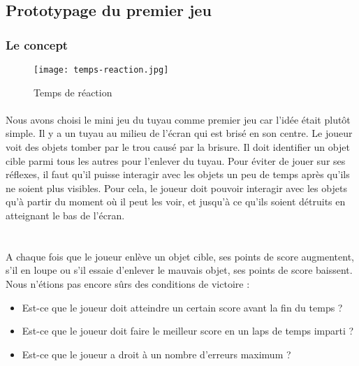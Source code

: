 \subsection{Prototypage du premier jeu}


\subsubsection{Le concept}


\begin{wrapfigure}[15]{l}{5cm}
    \vspace{-15pt}
    \texttt{[image: temps-reaction.jpg]}
    \captionsetup{labelformat=simpleNumber}
    \caption{Temps de réaction}
\end{wrapfigure}

\paragraph{}Nous avons choisi le mini jeu du tuyau comme premier jeu car l'idée était plutôt simple. Il y a un tuyau au milieu de l'écran qui est brisé en son centre. Le
joueur voit des objets tomber par le trou causé par la brisure. Il doit identifier un objet cible parmi tous les autres pour l'enlever du tuyau. Pour éviter de jouer sur ses réflexes,
il faut qu'il puisse interagir avec les objets un peu de temps après qu'ils ne soient plus visibles. Pour cela, le joueur doit pouvoir interagir avec les objets qu'à partir du moment
où il peut les voir, et jusqu'à ce qu'ils soient détruits en atteignant le bas de l'écran.\\ \\

\paragraph{}A chaque fois que le joueur enlève un objet cible, ses points de score augmentent, s'il en loupe ou s'il essaie d'enlever le mauvais objet, ses points de score baissent.
Nous n'étions pas encore sûrs des conditions de victoire :
\begin{itemize}
\item Est-ce que le joueur doit atteindre un certain score avant la fin du temps ?
\item Est-ce que le joueur doit faire le meilleur score en un laps de temps imparti ?
\item Est-ce que le joueur a droit à un nombre d'erreurs maximum ?
\end{itemize}


